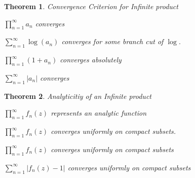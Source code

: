 \documentclass[12pt]{Qual}
\newtheorem{theorem}{Theorem}
\begin{document}
\begin{theorem}{\Large\textit{Convergence Criterion for Infinite product}}

\begin{minipage}{0.4\textwidth}
$\displaystyle \prod_{n=1}^\infty a_n$ converges
\end{minipage}\boxed{\iff}\hspace{0.5cm}\begin{minipage}{0.4\textwidth}
$\displaystyle\sum_{n=1}^\infty\log(a_n)$ converges for some branch cut of $\log.$
\end{minipage}
\vspace{0.5cm}

\begin{minipage}{0.4\textwidth}
$\displaystyle \prod_{n=1}^\infty(1+a_n)$ converges absolutely
\end{minipage}\boxed{\iff}\hspace{0.5cm}\begin{minipage}{0.4\textwidth}
$\displaystyle\sum_{n=1}^\infty|a_n|$ converges
\end{minipage}
\vspace{0.5cm}

\end{theorem}
\vspace{0.25cm}
\begin{theorem}{\Large\textit{Analyticitiy of an Infinite product}}

\begin{minipage}{0.4\textwidth}
$\displaystyle \prod_{n=1}^\infty f_n(z)$ represents an analytic function
\end{minipage}\hspace{0.5cm}\boxed{\iff}\hspace{0.5cm}\begin{minipage}{0.4\textwidth}
$\displaystyle \prod_{n=1}^\infty f_n(z)$ converges uniformly on compact subsets.
\end{minipage}
\vspace{0.5cm}

\begin{minipage}{0.4\textwidth}
$\displaystyle \prod_{n=1}^\infty f_n(z)$ converges uniformly on compact subsets
\end{minipage}\hspace{0.5cm}\boxed{\iff}\hspace{0.5cm}\begin{minipage}{0.4\textwidth}
$\displaystyle\sum_{n=1}^\infty|f_n(z)-1|$ converges uniformly on compact subsets
\end{minipage}

\end{theorem}
\end{document}
